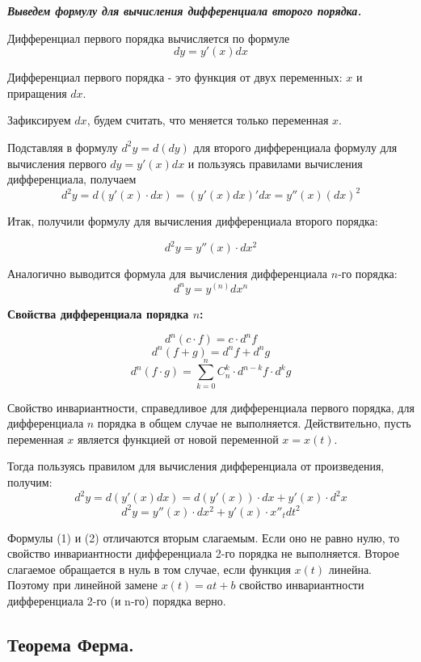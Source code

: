 \documentclass[a4paper,12pt]{article}
\theoremstyle{plain} %
\theoremstyle{definition} %
\theoremstyle{remark} %
\begin{document}
\textbf{\textit{Выведем формулу для вычисления дифференциала второго порядка.}}

Дифференциал первого порядка вычисляется по формуле
\[
	dy = y'(x) dx
\]

Дифференциал первого порядка - это функция от двух переменных: $x$ и приращения $dx$.

Зафиксируем $dx$, будем считать, что меняется только переменная $x$.

Подставляя в формулу $d^2y = d(dy)$ для второго дифференциала формулу для вычисления первого $dy = y'(x)dx$ и пользуясь правилами вычисления дифференциала, получаем
\[
	d^2y = d(y'(x) \cdot dx) = (y'(x)dx)'dx = y''(x)(dx)^2
\]

Итак, получили формулу для вычисления дифференциала второго порядка:

\[
	d^2y = y''(x) \cdot dx^2
\]

Аналогично выводится формула для вычисления дифференциала $n$-го порядка:
\[
	d^ny = y^{(n)}dx^n
\]

\textbf{Свойства дифференциала порядка $n$:}

\[
	d^n(c\cdot f) = c\cdot d^n f
\]
\[
	d^n(f + g) = d^nf + d^ng
\]
\[
	d^n(f\cdot g) = \sum_{k = 0}^n C_n^k \cdot d^{n-k}f \cdot d^k g
\]

Свойство инвариантности, справедливое для дифференциала первого порядка, для дифференциала $n$ порядка в общем случае не выполняется. Действительно, пусть переменная $x$ является функцией от новой переменной $x = x(t)$.

Тогда пользуясь правилом для вычисления дифференциала от произведения, получим:
\[
	d^2y = d(y'(x)dx) = d(y'(x)) \cdot dx + y'(x) \cdot d^2x
\]
\[
	d^2y = y''(x) \cdot dx^2 + y'(x) \cdot x''_t dt^2
\]

Формулы (1) и (2) отличаются вторым слагаемым. Если оно не равно нулю, то свойство инвариантности дифференциала 2-го порядка не выполняется. Второе слагаемое обращается в нуль в том случае, если функция $x(t)$ линейна. Поэтому при линейной замене $x(t) = at + b$ свойство инвариантности дифференциала 2-го (и n-го) порядка верно.




\newpage
{}
\subsection*{Теорема Ферма.                                                                             }
\end{document}

